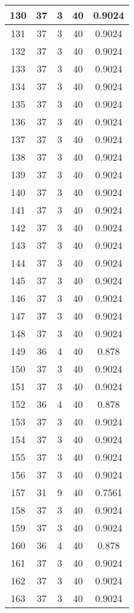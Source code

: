 \documentclass[letterpaper, 12pt]{article}
\begin{document}
\begin{longtable}{|c|c|c|c|c|}
\hline
130 & 37 & 3 & 40 & 0.9024 \\
\hline
131 & 37 & 3 & 40 & 0.9024 \\
\hline
132 & 37 & 3 & 40 & 0.9024 \\
\hline
133 & 37 & 3 & 40 & 0.9024 \\
\hline
134 & 37 & 3 & 40 & 0.9024 \\
\hline
135 & 37 & 3 & 40 & 0.9024 \\
\hline
136 & 37 & 3 & 40 & 0.9024 \\
\hline
137 & 37 & 3 & 40 & 0.9024 \\
\hline
138 & 37 & 3 & 40 & 0.9024 \\
\hline
139 & 37 & 3 & 40 & 0.9024 \\
\hline
140 & 37 & 3 & 40 & 0.9024 \\
\hline
141 & 37 & 3 & 40 & 0.9024 \\
\hline
142 & 37 & 3 & 40 & 0.9024 \\
\hline
143 & 37 & 3 & 40 & 0.9024 \\
\hline
144 & 37 & 3 & 40 & 0.9024 \\
\hline
145 & 37 & 3 & 40 & 0.9024 \\
\hline
146 & 37 & 3 & 40 & 0.9024 \\
\hline
147 & 37 & 3 & 40 & 0.9024 \\
\hline
148 & 37 & 3 & 40 & 0.9024 \\
\hline
149 & 36 & 4 & 40 & 0.878 \\
\hline
150 & 37 & 3 & 40 & 0.9024 \\
\hline
151 & 37 & 3 & 40 & 0.9024 \\
\hline
152 & 36 & 4 & 40 & 0.878 \\
\hline
153 & 37 & 3 & 40 & 0.9024 \\
\hline
154 & 37 & 3 & 40 & 0.9024 \\
\hline
155 & 37 & 3 & 40 & 0.9024 \\
\hline
156 & 37 & 3 & 40 & 0.9024 \\
\hline
157 & 31 & 9 & 40 & 0.7561 \\
\hline
158 & 37 & 3 & 40 & 0.9024 \\
\hline
159 & 37 & 3 & 40 & 0.9024 \\
\hline
160 & 36 & 4 & 40 & 0.878 \\
\hline
161 & 37 & 3 & 40 & 0.9024 \\
\hline
162 & 37 & 3 & 40 & 0.9024 \\
\hline
163 & 37 & 3 & 40 & 0.9024 \\

\end{longtable}
\end{document}
